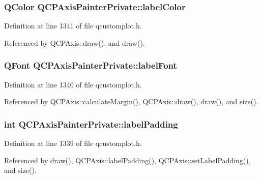 \subsubsection[{label\+Color}]{\setlength{\rightskip}{0pt plus 5cm}Q\+Color Q\+C\+P\+Axis\+Painter\+Private\+::label\+Color}\label{class_q_c_p_axis_painter_private_a5c36467daf057da0cf0792f3c5a06089}


Definition at line 1341 of file qcustomplot.\+h.



Referenced by Q\+C\+P\+Axis\+::draw(), and draw().

\hypertarget{class_q_c_p_axis_painter_private_add1ff1030fbc36112c19b1468ad82d55}{}
\subsubsection[{label\+Font}]{\setlength{\rightskip}{0pt plus 5cm}Q\+Font Q\+C\+P\+Axis\+Painter\+Private\+::label\+Font}\label{class_q_c_p_axis_painter_private_add1ff1030fbc36112c19b1468ad82d55}


Definition at line 1340 of file qcustomplot.\+h.



Referenced by Q\+C\+P\+Axis\+::calculate\+Margin(), Q\+C\+P\+Axis\+::draw(), draw(), and size().

\hypertarget{class_q_c_p_axis_painter_private_a3f7465372df132bf7814345ea697dd34}{}
\subsubsection[{label\+Padding}]{\setlength{\rightskip}{0pt plus 5cm}int Q\+C\+P\+Axis\+Painter\+Private\+::label\+Padding}\label{class_q_c_p_axis_painter_private_a3f7465372df132bf7814345ea697dd34}


Definition at line 1339 of file qcustomplot.\+h.



Referenced by draw(), Q\+C\+P\+Axis\+::label\+Padding(), Q\+C\+P\+Axis\+::set\+Label\+Padding(), and size().

\hypertarget{class_q_c_p_axis_painter_private_a077696dd1e7efb96e4c199f521433e24}{}
